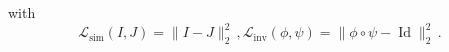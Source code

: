 with
\begin{equation}
    \mathcal{L}_{\text{sim}}(I,J) = \|I-J\|_2^2\,,
    \mathcal{L}_{\text{inv}}(\phi,\psi) = \|\phi \circ \psi - \operatorname{Id}\|_2^2\,.
\end{equation}

